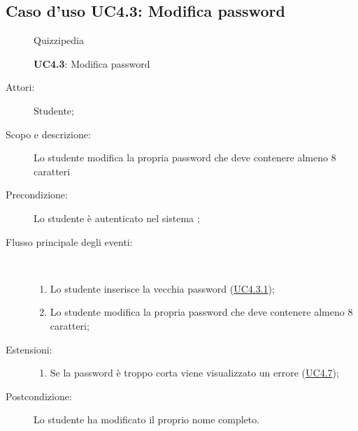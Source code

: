 \subsection{Caso d'uso UC4.3: Modifica password}
	\begin{figure}[H]
		\centering
		\begin{resizedtikzpicture}{\textwidth}
		\begin{umlsystem}[x=0, fill=lightgray!20]{Quizzipedia}
		\end{umlsystem}
		\end{resizedtikzpicture}
		\caption{\textbf{UC4.3}: Modifica password}
		\label{UC4.3}
	\end{figure}
\begin{description}
\item[Attori:] Studente;
\item[Scopo e descrizione:] Lo studente modifica la propria password che deve contenere almeno 8 caratteri
      \item[Precondizione:] Lo studente è autenticato nel sistema
;

        \item[Flusso principale degli eventi:] \ 
 \begin{enumerate}
          \item Lo studente inserisce la vecchia password (\hyperlink{UC4.3.1}{UC4.3.1});
          \item Lo studente modifica la propria password che deve contenere almeno 8 caratteri;

      \end{enumerate}
    \item[Estensioni:]
      \begin{enumerate}
          \item Se la password è troppo corta viene visualizzato un errore	 (\hyperlink{UC4.7}{UC4.7});

      \end{enumerate}
    \item[Postcondizione:] Lo studente ha modificato il proprio nome completo.
  \end{description}
\hypertarget{UC4.3.1}{}

